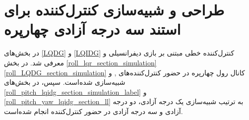 \chapter{طراحی و شبیه‌سازی کنترل‌کننده برای استند سه درجه آزادی چهارپره}\label{MIL}
در بخش‌های
\ref{LQDG}
و
\ref{LQIDG}
کنترل‌کننده خطی مبتنی بر بازی دیفرانسیلی  و  معرفی شد.
در بخش
\ref{roll_lqr_section_simulation}
\ref{roll_LQDG_section_simulation}
کانال 	رول چهارپره در حضور کنترل‌کننده‌های
,
و
شبیه‌سازی شده‌است. سپس، در بخش‌های
\ref{roll_pitch_lqidg_section_simulation_label}
و
\ref{roll_pitch_yaw_lqidg_section_ll}
به‌ ترتیب شبیه‌سازی یک درجه آزادی، دو درجه آزادی و سه درجه آزادی در حضور کنترل‌کننده‌  انجام شده‌است.
